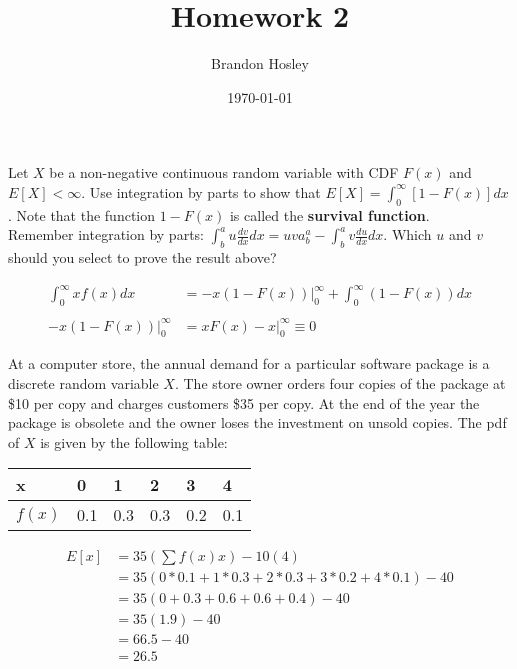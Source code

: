 \documentclass[answers]{exam}
\title{Homework 2}
\author{Brandon Hosley}
\date{\today}
\begin{document}
\maketitle

\begin{questions}
\question
Let $X$ be a non-negative continuous random variable with CDF $F(x)$ and 
$E[X]<\infty$. Use integration by parts to show that $E[X] = \int_{0}^{\infty}[1−F(x)] dx$.  Note that the function $1−F(x)$ is called the \textbf{survival function}. \\
Remember integration by parts: $\int_{b}^{a} u \frac{dv}{dx} dx = uv a_b^a -\int_{b}^{a}v\frac{du}{dx} dx$.  Which $u$ and $v$ should you select to prove the result above?
	
\begin{solution}[1in]
	\begin{align*}
		\int_{0}^{\infty} xf(x)dx &=  \left. -x( 1-F(x) ) \right|_0^\infty + \int_{0}^{\infty}( 1-F(x) )dx \\
		& \\
		\left. -x( 1-F(x) ) \right|_0^\infty &= \left. xF(x)-x \right|_0^\infty \equiv 0
	\end{align*}
\end{solution}
	
\question 
At a computer store, the annual demand for a particular software package is a discrete random variable $X$. The store owner orders four copies of the package at \$10 per copy and charges customers \$35 per copy. At the end of the year the package is obsolete and the owner loses the investment on unsold copies. The pdf of $X$ is given by the following table:\\
	\begin{tabular}{l|lllll}
		\textbf{x }  & 0   & 1   & 2   & 3   & 4   \\ \hline
		$f(x)$ & 0.1 & 0.3 & 0.3 & 0.2 & 0.1
	\end{tabular}

\begin{solution}
	\begin{align*}
		E[x] &= 35(\sum f(x) x) - 10(4) \\
		&= 35(0*0.1 + 1*0.3 + 2*0.3+ 3*0.2 + 4*0.1) - 40 \\
		&= 35(0 + 0.3 + 0.6 + 0.6 + 0.4) -40 \\
		&= 35(1.9) - 40 \\
		&= 66.5 - 40 \\
		&= 26.5
	\end{align*}
\end{solution}


\end{questions}
\end{document}
